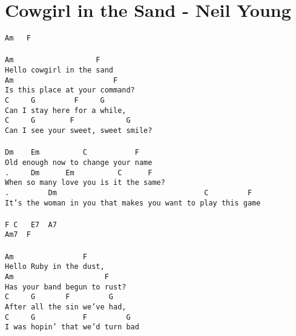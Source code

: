 \newpage
\section{Cowgirl in the Sand - Neil Young}
\label{Cowgirl in the Sand - Neil Young}
\texttt{Am\ \ \ F\\
\\
Am\ \ \ \ \ \ \ \ \ \ \ \ \ \ \ \ \ \ \ F\\
Hello\ cowgirl\ in\ the\ sand\\
Am\ \ \ \ \ \ \ \ \ \ \ \ \ \ \ \ \ \ \ \ \ \ \ F\\
Is\ this\ place\ at\ your\ command?\\
C\ \ \ \ \ G\ \ \ \ \ \ \ \ \ F\ \ \ \ \ G\\
Can\ I\ stay\ here\ for\ a\ while,\\
C\ \ \ \ \ G\ \ \ \ \ \ \ \ F\ \ \ \ \ \ \ \ \ \ \ \ G\\
Can\ I\ see\ your\ sweet,\ sweet\ smile?\\
\\
Dm\ \ \ \ Em\ \ \ \ \ \ \ \ \ \ C\ \ \ \ \ \ \ \ \ \ \ F\\
Old\ enough\ now\ to\ change\ your\ name\\
. \ \ \ \ Dm\ \ \ \ \ \ Em\ \ \ \ \ \ \ \ \ \ C\ \ \ \ \ \ F\\
When\ so\ many\ love\ you\ is\ it\ the\ same?\\
. \ \ \ \ \ \ \ \ Dm\ \ \ \ \ \ \ \ \ \ \ \ \ \ \ \ \ \ \ \ \ \ \ \ \ \ \ \ \ \ \ \ \ \ C\ \ \ \ \ \ \ \ \ F\\
It's\ the\ woman\ in\ you\ that\ makes\ you\ want\ to\ play\ this\ game\\
\\
F\ C\ \ \ E7\ \ A7\\
Am7\ \ F\\
\\
Am\ \ \ \ \ \ \ \ \ \ \ \ \ \ \ \ F\\
Hello\ Ruby\ in\ the\ dust,\\
Am\ \ \ \ \ \ \ \ \ \ \ \ \ \ \ \ \ \ \ \ \ F\\
Has\ your\ band\ begun\ to\ rust?\\
C\ \ \ \ \ G\ \ \ \ \ \ \ F\ \ \ \ \ \ \ \ \ G\\
After\ all\ the\ sin\ we've\ had,\\
C\ \ \ \ \ G\ \ \ \ \ \ \ \ \ \ \ F\ \ \ \ \ \ \ \ \ G\\
I\ was\ hopin'\ that\ we'd\ turn\ bad\\
\\
}
